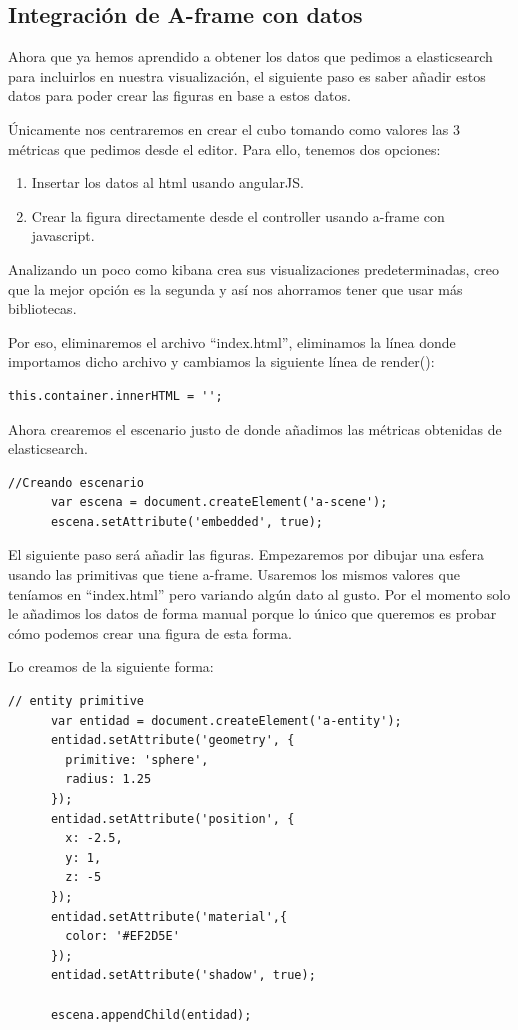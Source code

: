 \documentclass[a4paper, 12pt]{book}
\begin{document}
\subsection{Integración de A-frame con datos}
Ahora que ya hemos aprendido a obtener los datos que pedimos a elasticsearch para incluirlos en nuestra visualización, el siguiente paso es saber añadir estos datos para poder crear las figuras en base a estos datos.

Únicamente nos centraremos en crear el cubo tomando como valores las 3 métricas que pedimos desde el editor. Para ello, tenemos dos opciones:
\begin{enumerate}
    \item Insertar los datos al html usando angularJS.
    \item Crear la figura directamente desde el controller usando a-frame con javascript.
\end{enumerate}
Analizando un poco como kibana crea sus visualizaciones predeterminadas, creo que la mejor opción es la segunda y así nos ahorramos tener que usar más bibliotecas.

Por eso, eliminaremos el archivo “index.html”, eliminamos la línea donde importamos dicho archivo y cambiamos la siguiente línea de render():

\begin{lstlisting}[frame=single]
    this.container.innerHTML = '';
\end{lstlisting}

Ahora crearemos el escenario justo de donde añadimos las métricas obtenidas de elasticsearch.

\begin{lstlisting}[frame=single]
     //Creando escenario
      var escena = document.createElement('a-scene');
      escena.setAttribute('embedded', true);
\end{lstlisting}

El siguiente paso será añadir las figuras. Empezaremos por dibujar una esfera usando las primitivas que tiene a-frame. Usaremos los mismos valores que teníamos en “index.html” pero variando algún dato al gusto. Por el momento solo le añadimos los datos de forma manual porque lo único que queremos es probar cómo podemos crear una figura de esta forma.

Lo creamos de la siguiente forma:

\begin{lstlisting}[frame=single]
     // entity primitive
      var entidad = document.createElement('a-entity');
      entidad.setAttribute('geometry', {
        primitive: 'sphere',
        radius: 1.25
      });
      entidad.setAttribute('position', {
        x: -2.5,
        y: 1,
        z: -5
      });
      entidad.setAttribute('material',{
        color: '#EF2D5E'
      });
      entidad.setAttribute('shadow', true);

      escena.appendChild(entidad);
\end{lstlisting}
\end{document}
